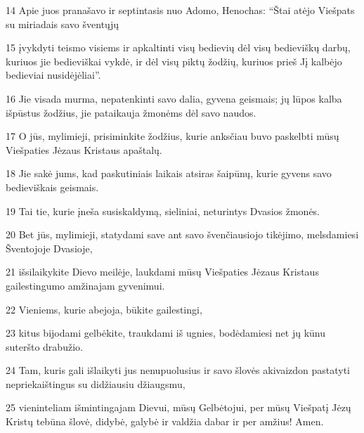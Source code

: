 \par 14 Apie juos pranašavo ir septintasis nuo Adomo, Henochas: “Štai atėjo Viešpats su miriadais savo šventųjų 
\par 15 įvykdyti teismo visiems ir apkaltinti visų bedievių dėl visų bedieviškų darbų, kuriuos jie bedieviškai vykdė, ir dėl visų piktų žodžių, kuriuos prieš Jį kalbėjo bedieviai nusidėjėliai”. 
\par 16 Jie visada murma, nepatenkinti savo dalia, gyvena geismais; jų lūpos kalba išpūstus žodžius, jie pataikauja žmonėms dėl savo naudos. 
\par 17 O jūs, mylimieji, prisiminkite žodžius, kurie anksčiau buvo paskelbti mūsų Viešpaties Jėzaus Kristaus apaštalų. 
\par 18 Jie sakė jums, kad paskutiniais laikais atsiras šaipūnų, kurie gyvens savo bedieviškais geismais. 
\par 19 Tai tie, kurie įneša susiskaldymą, sieliniai, neturintys Dvasios žmonės. 
\par 20 Bet jūs, mylimieji, statydami save ant savo švenčiausiojo tikėjimo, melsdamiesi Šventojoje Dvasioje, 
\par 21 išsilaikykite Dievo meilėje, laukdami mūsų Viešpaties Jėzaus Kristaus gailestingumo amžinajam gyvenimui. 
\par 22 Vieniems, kurie abejoja, būkite gailestingi, 
\par 23 kitus bijodami gelbėkite, traukdami iš ugnies, bodėdamiesi net jų kūnu suteršto drabužio. 
\par 24 Tam, kuris gali išlaikyti jus nenupuolusius ir savo šlovės akivaizdon pastatyti nepriekaištingus su didžiausiu džiaugsmu, 
\par 25 vieninteliam išmintingajam Dievui, mūsų Gelbėtojui, per mūsų Viešpatį Jėzų Kristų tebūna šlovė, didybė, galybė ir valdžia dabar ir per amžius! Amen.


